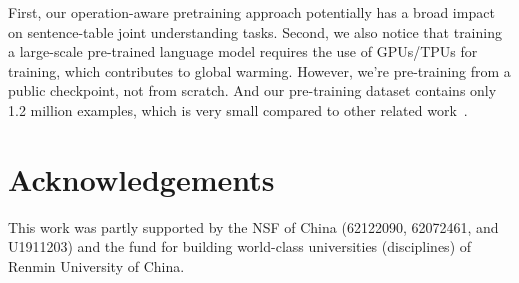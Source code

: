 \documentclass[11pt]{article}
\newcommand{\stitle}[1]{\vspace{1mm}\noindent{\bf #1}}
\begin{document}
\stitle{Broader Impact} First, our operation-aware pretraining approach potentially has a broad impact on sentence-table joint understanding tasks. Second, we also notice that training a large-scale pre-trained language model requires the use of GPUs/TPUs for training, which contributes to global warming. However, we're pre-training from a public checkpoint, not from scratch. And our pre-training dataset contains only 1.2 million examples, which is very small compared to other related work~\cite{tapasfv,tapex}.  \section*{Acknowledgements}
This work was partly supported by the NSF of China (62122090, 62072461, and U1911203) and the fund for building world-class universities (disciplines) of Renmin University of China.


\appendix
\end{document}
